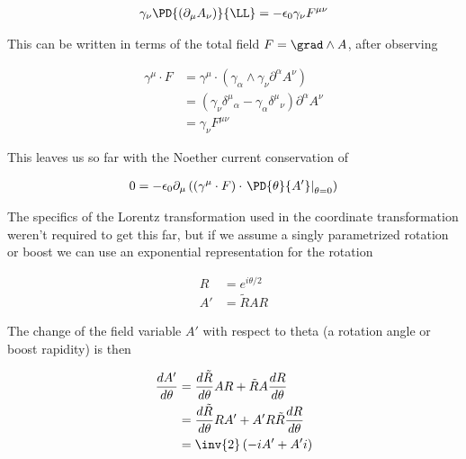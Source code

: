 \begin{align}\label{eqn:maxwellLagRot:goo4}
\gamma_\nu \PD{(\partial_\mu {A}_\nu)}{\LL} = -\epsilon_0 \gamma_\nu F^{\mu\nu}
\end{align}

This can be written in terms of the total field $F = \grad \wedge A$, after observing

\begin{align*}
\gamma^\mu \cdot F
&=
\gamma^\mu \cdot (\gamma_\alpha \wedge \gamma_\nu \partial^\alpha A^\nu) \\
&=
(\gamma_\nu {\delta^\mu}_\alpha - \gamma_\alpha {\delta^\mu}_\nu ) \partial^\alpha A^\nu \\
&=
\gamma_\nu F^{\mu\nu}
\end{align*}


This leaves us so far with the Noether current conservation of

\begin{align}\label{eqn:maxwellLagRot:goo6}
0 = -\epsilon_0 \partial_\mu \left( (\gamma^\mu \cdot F) \cdot {\left. \PD{\theta}{A'} \right\vert}_{\theta=0}  \right)
\end{align}

The specifics of the Lorentz transformation used in the coordinate transformation weren't required to get this far, but if we assume a singly parametrized rotation or boost we can use an exponential representation for the rotation

\begin{align}\label{eqn:maxwellLagRot:goo7}
R &= e^{i\theta/2} \\
A' &= \tilde{R} A R
\end{align}

The change of the field variable $A'$ with respect to theta (a rotation angle or boost rapidity) is then

\begin{align*}
\frac{dA'}{d\theta}
&= \frac{d\tilde{R}}{d\theta} A R + \tilde{R} A \frac{d R}{d\theta} \\
&= \frac{d\tilde{R}}{d\theta} R A' + A' R \tilde{R} \frac{d R}{d\theta} \\
&= \inv{2} \left( -i A' + A' i \right) \\
\end{align*}

